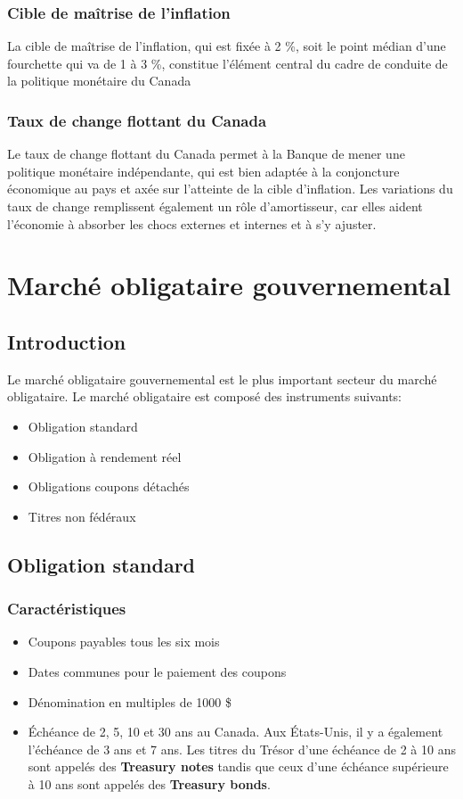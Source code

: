 \documentclass[12pt]{article}
\begin{document}
\subsection{Cible de maîtrise de l’inflation}
La cible de maîtrise de l’inflation, qui est fixée à 2 \%, soit le point médian d’une fourchette qui va de 1 à 3 \%, constitue l’élément central du cadre de conduite de la politique monétaire du Canada
\subsection{Taux de change flottant du Canada}
Le taux de change flottant du Canada permet à la Banque de mener une politique monétaire indépendante, qui est bien adaptée à la conjoncture économique au pays et axée sur l’atteinte de la cible d’inflation. Les variations du taux de change remplissent également un rôle d’amortisseur,  car elles aident l’économie à absorber les chocs externes et internes et à s’y ajuster.

\chapter{Marché obligataire gouvernemental}
\section{Introduction}
Le marché obligataire gouvernemental est le plus important secteur du marché obligataire.  Le marché obligataire est composé des instruments suivants:
\begin{itemize}
\item Obligation standard
\item Obligation à rendement réel
\item Obligations coupons détachés
\item Titres non fédéraux
\end{itemize}
\section{ Obligation standard}
\subsection{Caractéristiques}
\begin{itemize}
\item Coupons payables tous les six mois
\item Dates communes pour le paiement des coupons
\item  Dénomination en multiples de 1000 \$
\item Échéance de 2, 5, 10 et 30 ans au Canada.  Aux États-Unis, il y a également l’échéance de 3 ans et 7 ans.  Les titres du Trésor d’une échéance de 2 à 10 ans sont appelés des \textbf{Treasury notes} tandis que ceux d’une échéance supérieure à 10 ans sont appelés des  \textbf{Treasury bonds}.
\end{itemize}
\newpage
\end{document}

